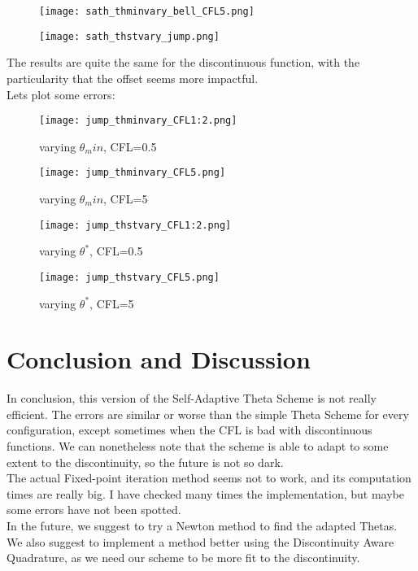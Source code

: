 \documentclass[12pt]{article}
\begin{document}
\begin{figure}[H]
    \centering
    \texttt{[image: sath\_thminvary\_bell\_CFL5.png]}
\end{figure}

\begin{figure}[H]
    \centering
    \texttt{[image: sath\_thstvary\_jump.png]}
\end{figure}

The results are quite the same for the discontinuous function, with the particularity that the offset seems more impactful.\\
Lets plot some errors:

\begin{figure}[H]
    \centering
    \texttt{[image: jump\_thminvary\_CFL1:2.png]}
    \caption{varying $\theta_min$, CFL=0.5}
\end{figure}

\begin{figure}[H]
    \centering
    \texttt{[image: jump\_thminvary\_CFL5.png]}
    \caption{varying $\theta_min$, CFL=5}
\end{figure}

\begin{figure}[H]
    \centering
    \texttt{[image: jump\_thstvary\_CFL1:2.png]}
    \caption{varying $\theta^*$, CFL=0.5}
\end{figure}

\begin{figure}[H]
    \centering
    \texttt{[image: jump\_thstvary\_CFL5.png]}
    \caption{varying $\theta^*$, CFL=5}
\end{figure}

\section{Conclusion and Discussion}
In conclusion, this version of the Self-Adaptive Theta Scheme is not really efficient. The errors are similar or worse than the simple Theta Scheme for every configuration, except sometimes when the CFL is bad with discontinuous functions.
We can nonetheless note that the scheme is able to adapt to some extent to the discontinuity, so the future is not so dark.\\
The actual Fixed-point iteration method seems not to work, and its computation times are really big. I have checked many times the implementation, but maybe some errors have not been spotted.\\
In the future, we suggest to try a Newton method to find the adapted Thetas. We also suggest to implement a method better using the Discontinuity Aware Quadrature, as we need our scheme to be more fit to the discontinuity.
\end{document}
